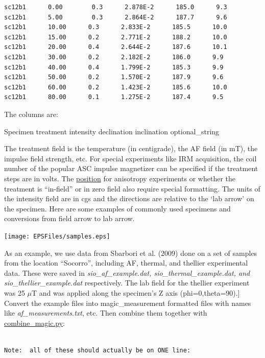 \documentclass[11pt]{book}
\begin{document}
{{{{\begin{verbatim}
sc12b1      0.00        0.3      2.878E-2      185.0      9.3
sc12b1      5.00        0.3      2.864E-2      187.7      9.6
sc12b1      10.00      0.3      2.833E-2      185.5      10.0
sc12b1      15.00      0.2      2.771E-2      188.2      10.0
sc12b1      20.00      0.4      2.644E-2      187.6      10.1
sc12b1      30.00      0.2      2.182E-2      186.0      9.9
sc12b1      40.00      0.4      1.799E-2      185.3      9.9
sc12b1      50.00      0.2      1.570E-2      187.9      9.6
sc12b1      60.00      0.2      1.423E-2      185.6      10.0
sc12b1      80.00      0.1      1.275E-2      187.4      9.5
\end{verbatim}

The columns are:

Specimen    treatment   intensity   declination   inclination   optional\_string


The treatment field is the temperature (in centigrade), the AF field (in mT), the impulse field  strength, etc.  For special experiments like IRM acquisition, the  coil number of the popular ASC impulse magnetizer can be specified if the treatment steps are in volts.  The \href{#k15_magic.py}{position} for anisotropy experiments or whether the treatment is ``in-field'' or in zero field also require special formatting.  The units of the intensity field are in cgs and the directions are relative to the `lab arrow' on the specimen.  Here are some examples of commonly used specimens and conversions from field arrow to lab arrow.

\texttt{[image: EPSFiles/samples.eps]}




As an example, we use data from Sbarbori et al. (2009) \nocite{sbarbori09} done on a set of samples  from the location ``Socorro'', including AF, thermal,  and thellier experimental data.  These were saved in {\it sio\_af\_example.dat, sio\_thermal\_example.dat, and sio\_thellier\_example.dat} respectively.  The lab field for the thellier experiment was 25 $\mu$T and was applied along the specimen's Z axis (phi=0,theta=90).]
   Convert the example files  into magic\_measurement formatted files with names like
    {\it af\_measurements.txt}, etc.    Then combine them together with \href{#combine_magic}{combine\_magic.py}:

\begin{verbatim}

Note:  all of these should actually be on ONE line:


\end{verbatim}}}}}
\end{document}
